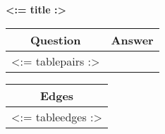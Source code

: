 \usepackage{longtable}


\begin{center}
  \textbf{<:= title :>}

  \bigskip

  \begin{longtable}{|c|c|}
    \hline
    \textbf{Question}&\textbf{Answer}\\\hline\endhead
    <:= tablepairs :>
  \end{longtable}

  \bigskip

  \begin{longtable}{|c|}
    \hline
    \textbf{Edges}\\\hline\endhead
    <:= tableedges :>
  \end{longtable}
\end{center}




